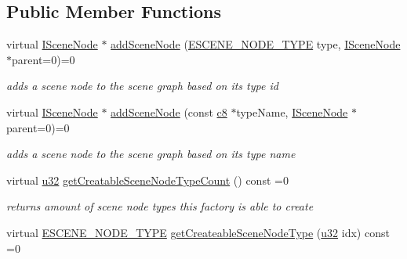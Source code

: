 \subsection*{Public Member Functions}
\begin{DoxyCompactItemize}
\item 
virtual \hyperlink{classirr_1_1scene_1_1ISceneNode}{I\+Scene\+Node} $\ast$ \hyperlink{classirr_1_1scene_1_1ISceneNodeFactory_a540de57f9f72a70ee622c536859f5997}{add\+Scene\+Node} (\hyperlink{namespaceirr_1_1scene_acad3d7ef92a9807d391ba29120f3b7bd}{E\+S\+C\+E\+N\+E\+\_\+\+N\+O\+D\+E\+\_\+\+T\+Y\+PE} type, \hyperlink{classirr_1_1scene_1_1ISceneNode}{I\+Scene\+Node} $\ast$parent=0)=0
\begin{DoxyCompactList}\small\item\em adds a scene node to the scene graph based on its type id \end{DoxyCompactList}\item 
virtual \hyperlink{classirr_1_1scene_1_1ISceneNode}{I\+Scene\+Node} $\ast$ \hyperlink{classirr_1_1scene_1_1ISceneNodeFactory_a7964a7a29260d7f0d4d052b85df78ffb}{add\+Scene\+Node} (const \hyperlink{namespaceirr_a9395eaea339bcb546b319e9c96bf7410}{c8} $\ast$type\+Name, \hyperlink{classirr_1_1scene_1_1ISceneNode}{I\+Scene\+Node} $\ast$parent=0)=0
\begin{DoxyCompactList}\small\item\em adds a scene node to the scene graph based on its type name \end{DoxyCompactList}\item 
\mbox{\label{classirr_1_1scene_1_1ISceneNodeFactory_a3c1be487fb0169ee9fbb7169c451d16e}} 
virtual \hyperlink{namespaceirr_a0416a53257075833e7002efd0a18e804}{u32} \hyperlink{classirr_1_1scene_1_1ISceneNodeFactory_a3c1be487fb0169ee9fbb7169c451d16e}{get\+Creatable\+Scene\+Node\+Type\+Count} () const =0
\begin{DoxyCompactList}\small\item\em returns amount of scene node types this factory is able to create \end{DoxyCompactList}\item 
virtual \hyperlink{namespaceirr_1_1scene_acad3d7ef92a9807d391ba29120f3b7bd}{E\+S\+C\+E\+N\+E\+\_\+\+N\+O\+D\+E\+\_\+\+T\+Y\+PE} \hyperlink{classirr_1_1scene_1_1ISceneNodeFactory_aaff4e3d3dc214ec83965ecbd8e8175a3}{get\+Createable\+Scene\+Node\+Type} (\hyperlink{namespaceirr_a0416a53257075833e7002efd0a18e804}{u32} idx) const =0

\end{DoxyCompactItemize}
